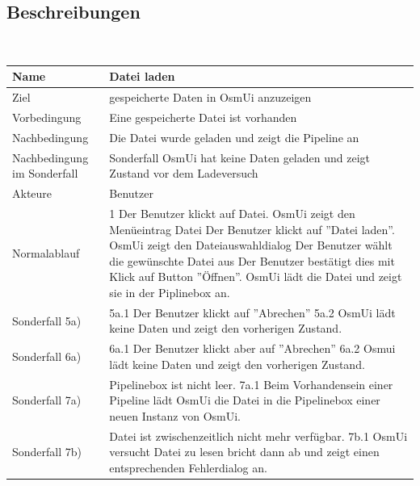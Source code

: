 \documentclass[a4paper,12pt]{scrartcl}
\begin{document}
\subsection{Beschreibungen}
\begin{center}
\ \\
\begin{tabular}{|p{5cm}|p{10cm}|}
\hline Name & \textbf{Datei laden} \\ 
\hline Ziel & gespeicherte Daten in OsmUi anzuzeigen \\ 
\hline Vorbedingung & Eine gespeicherte Datei ist vorhanden \\
\hline Nachbedingung & Die Datei wurde geladen und zeigt die Pipeline an\\ 
\hline Nachbedingung im Sonderfall & Sonderfall OsmUi hat keine Daten geladen und zeigt Zustand vor dem Ladeversuch \\ 
\hline Akteure & Benutzer \\ 
\hline Normalablauf & 1 Der Benutzer klickt auf Datei.
\newline 
2 OsmUi zeigt den Menüeintrag Datei
\newline
3 Der Benutzer klickt auf ''Datei laden''.
\newline
4 OsmUi zeigt den Dateiauswahldialog
\newline 
5 Der Benutzer wählt die gewünschte Datei aus
\newline
6 Der Benutzer bestätigt dies mit Klick auf Button ''Öffnen''.
\newline
7 OsmUi lädt die Datei und zeigt sie in der Piplinebox an.
\\ 
\hline Sonderfall 5a) & 5a.1 Der Benutzer klickt auf ''Abrechen''
\newline
5a.2 OsmUi lädt keine Daten und zeigt den vorherigen Zustand.\\
\hline Sonderfall 6a) & 6a.1 Der Benutzer klickt aber auf ''Abrechen''
\newline
6a.2 Osmui lädt keine Daten und zeigt den vorherigen Zustand.\\
\hline Sonderfall 7a) & Pipelinebox ist nicht leer.
\newline 
7a.1 Beim Vorhandensein einer Pipeline lädt OsmUi die Datei in die Pipelinebox einer neuen Instanz von OsmUi.\\
\hline Sonderfall 7b)& Datei ist zwischenzeitlich nicht mehr verfügbar.
\newline
 7b.1 OsmUi versucht Datei zu lesen bricht dann ab und zeigt einen entsprechenden Fehlerdialog an.
\newline

\end{tabular}
\end{center}
\end{document}
